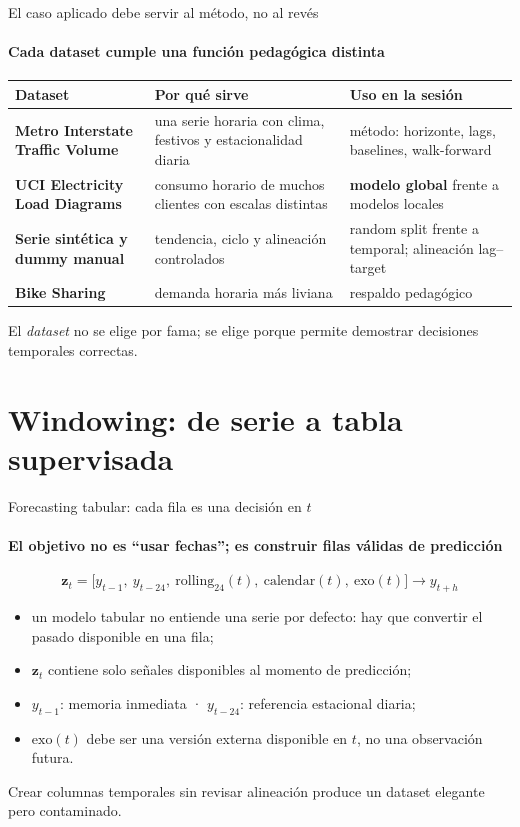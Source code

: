 \documentclass[aspectratio=169,11pt]{beamer}  %
\newcommand{\hrow}{\rowcolor{mlcream}}
\begin{document}
\begin{frame}{El caso aplicado debe servir al método, no al revés}
\framesubtitle{Cada dataset cumple una función pedagógica distinta}
\centering\footnotesize
\begin{tabular}{@{}P{0.27\textwidth} P{0.36\textwidth} P{0.30\textwidth}@{}}
\toprule
\hrow \textbf{Dataset} & Por qué sirve & Uso en la sesión\\
\midrule
\textbf{Metro Interstate Traffic Volume} & una serie horaria con clima, festivos y estacionalidad diaria & método: horizonte, lags, baselines, walk-forward\\
\textbf{UCI Electricity Load Diagrams} & consumo horario de muchos clientes con escalas distintas & \textbf{modelo global} frente a modelos locales\\
\textbf{Serie sintética y dummy manual} & tendencia, ciclo y alineación controlados & random split frente a temporal; alineación lag--target\\
\textbf{Bike Sharing} & demanda horaria más liviana & respaldo pedagógico\\
\bottomrule
\end{tabular}

{\small El \emph{dataset} no se elige por fama; se elige porque permite demostrar decisiones temporales correctas.\par}
\end{frame}

\section{Windowing: de serie a tabla supervisada}

\begin{frame}{Forecasting tabular: cada fila es una decisión en $t$}
\framesubtitle{El objetivo no es ``usar fechas''; es construir filas válidas de predicción}
{\large\[ \mathbf{z}_t = \bigl[y_{t-1},\ y_{t-24},\ \mathrm{rolling}_{24}(t),\ \mathrm{calendar}(t),\ \mathrm{exo}(t)\bigr] \longrightarrow y_{t+h} \]}
\begin{itemize}\small
\item un modelo tabular no entiende una serie por defecto: hay que convertir el pasado disponible en una fila;
\item $\mathbf{z}_t$ contiene solo señales disponibles al momento de predicción;
\item $y_{t-1}$: memoria inmediata · $y_{t-24}$: referencia estacional diaria;
\item $\mathrm{exo}(t)$ debe ser una versión externa disponible en $t$, no una observación futura.
\end{itemize}
\begin{rulebox}
\small Crear columnas temporales sin revisar alineación produce un dataset elegante pero contaminado.
\end{rulebox}
\end{frame}
\end{document}
